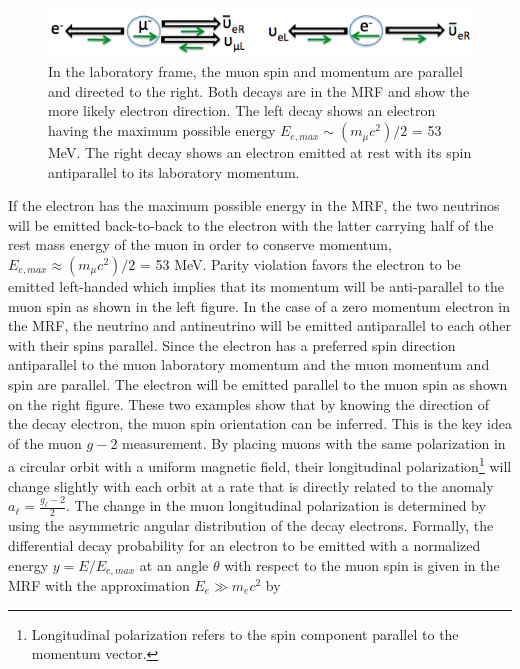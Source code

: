 \documentclass{outhesis}
\begin{document}
 \begin{figure}
  \centering
  \includegraphics[scale=0.5]{figures/mu_decay}
  \caption{ In the laboratory frame, the muon spin and momentum are parallel and directed to the right. Both decays are in the MRF and show the more likely electron direction. The left decay shows an electron having the maximum possible energy $E_{e,max}\sim \left(m_{\mu}c^2\right)/2$ = 53 MeV. The right decay shows an electron emitted at rest with its spin antiparallel to its laboratory momentum. }
  \label{fig:muon}
\end{figure}
If the electron has the maximum possible energy in the MRF, the two neutrinos will be emitted back-to-back to the electron with the latter carrying half of the rest mass energy of the muon in order to conserve momentum, $E_{e,max}\approx \left(m_{\mu}c^2\right)/2$ = 53 MeV. 
Parity violation favors the electron to be emitted left-handed which implies that its momentum will be anti-parallel to the muon spin as shown in the left figure. In the case of a zero momentum electron in the MRF, the neutrino and antineutrino will be emitted antiparallel to each other with their spins parallel. Since the electron has a preferred spin direction antiparallel to the muon laboratory momentum and the muon momentum and spin are parallel. The electron will be emitted parallel to the muon spin as shown on the right figure. These two examples show that by knowing the direction of the decay electron, the muon spin orientation can be inferred. This is the key idea of the muon $g-2$ measurement. By placing muons with the same polarization in a circular orbit with a uniform magnetic field, their longitudinal polarization\footnote{Longitudinal polarization refers to the spin component parallel to the momentum vector.} will change slightly with each orbit at a rate that is directly related to the anomaly $a_{\ell} = \frac{g_\ell-2}{2}$. The change in the muon longitudinal polarization is determined by using the asymmetric angular distribution of the decay electrons. Formally, the differential decay probability for an electron to be emitted with a normalized energy $y=E/E_{e,max}$ at an angle $\theta$ with respect to the muon spin is given in the MRF with the approximation $E_e \gg m_e c^2$ by
\end{document}
